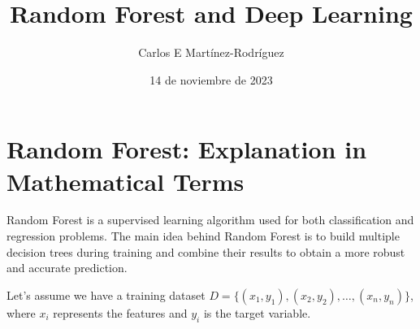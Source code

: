\documentclass{article}
\title{Random Forest and Deep Learning}
\author{Carlos E Mart\'inez-Rodr\'iguez}
\date{14  de noviembre de 2023}  %
\begin{document}
\maketitle
\tableofcontents

\newpage

\section{Random Forest: Explanation in Mathematical Terms}

Random Forest is a supervised learning algorithm used for both classification and regression problems. The main idea behind Random Forest is to build multiple decision trees during training and combine their results to obtain a more robust and accurate prediction.

Let's assume we have a training dataset \(D = \{(x_1, y_1), (x_2, y_2), \ldots, (x_n, y_n)\}\), where \(x_i\) represents the features and \(y_i\) is the target variable.
\end{document}
